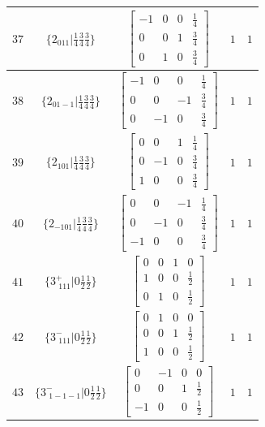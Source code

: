 \documentclass[fleqn,8pt]{jsarticle}
\begin{document}
\begin{longtable}{ccccc}
$ 37 $ & $ \{2{}_{011}|\frac{1}{4} \frac{3}{4} \frac{3}{4}\} $ & $ \begin{bmatrix} -1 & 0 & 0 & \frac{1}{4} \\ 0 & 0 & 1 & \frac{3}{4} \\ 0 & 1 & 0 & \frac{3}{4} \end{bmatrix} $ & $ 1 $ & $ 1 $ \\ \hline
$ 38 $ & $ \{2{}_{01-1}|\frac{1}{4} \frac{3}{4} \frac{3}{4}\} $ & $ \begin{bmatrix} -1 & 0 & 0 & \frac{1}{4} \\ 0 & 0 & -1 & \frac{3}{4} \\ 0 & -1 & 0 & \frac{3}{4} \end{bmatrix} $ & $ 1 $ & $ 1 $ \\ \hline
$ 39 $ & $ \{2{}_{101}|\frac{1}{4} \frac{3}{4} \frac{3}{4}\} $ & $ \begin{bmatrix} 0 & 0 & 1 & \frac{1}{4} \\ 0 & -1 & 0 & \frac{3}{4} \\ 1 & 0 & 0 & \frac{3}{4} \end{bmatrix} $ & $ 1 $ & $ 1 $ \\ \hline
$ 40 $ & $ \{2{}_{-101}|\frac{1}{4} \frac{3}{4} \frac{3}{4}\} $ & $ \begin{bmatrix} 0 & 0 & -1 & \frac{1}{4} \\ 0 & -1 & 0 & \frac{3}{4} \\ -1 & 0 & 0 & \frac{3}{4} \end{bmatrix} $ & $ 1 $ & $ 1 $ \\ \hline
$ 41 $ & $ \{3^{+}_{\,\,111}|0 \frac{1}{2} \frac{1}{2}\} $ & $ \begin{bmatrix} 0 & 0 & 1 & 0 \\ 1 & 0 & 0 & \frac{1}{2} \\ 0 & 1 & 0 & \frac{1}{2} \end{bmatrix} $ & $ 1 $ & $ 1 $ \\ \hline
$ 42 $ & $ \{3^{-}_{\,\,111}|0 \frac{1}{2} \frac{1}{2}\} $ & $ \begin{bmatrix} 0 & 1 & 0 & 0 \\ 0 & 0 & 1 & \frac{1}{2} \\ 1 & 0 & 0 & \frac{1}{2} \end{bmatrix} $ & $ 1 $ & $ 1 $ \\ \hline
$ 43 $ & $ \{3^{-}_{\,\,1-1-1}|0 \frac{1}{2} \frac{1}{2}\} $ & $ \begin{bmatrix} 0 & -1 & 0 & 0 \\ 0 & 0 & 1 & \frac{1}{2} \\ -1 & 0 & 0 & \frac{1}{2} \end{bmatrix} $ & $ 1 $ & $ 1 $ \\ \hline

\end{longtable}
\end{document}
